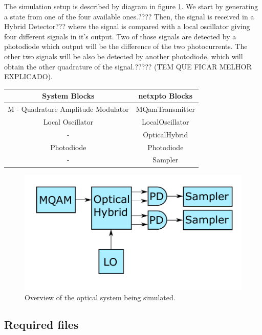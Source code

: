 The simulation setup is described by diagram in figure \ref{fig:setup}. We start by generating a state from one of the four available ones.???? Then, the signal is received in a Hybrid Detector??? where the signal is compared with a local oscillator giving four different signals in it's output. Two of those signals are detected by a photodiode which output will be the difference of the two photocurrents. The other two signals will be also be detected by another photodiode, which will obtain the other quadrature of the signal.????? (TEM QUE FICAR MELHOR EXPLICADO).

\begin{table}[H]
\centering
\begin{tabular}{c|c}
System Blocks       & netxpto Blocks
\\ \hline
M - Quadrature Amplitude Modulator	& MQamTransmitter\\
Local Oscillator 	& LocalOscillator\\
- 					& OpticalHybrid\\
Photodiode			& Photodiode\\
- 					& Sampler\\
\end{tabular}
\end{table}


\begin{figure}[h]
\centering
\includegraphics[width=\linewidth]{./sdf/quantum_noise/figures/scheme1.pdf}
\caption{Overview of the optical system being simulated.}
\label{fig:setup}
\end{figure}


\subsection*{Required files}\label{Required files}


